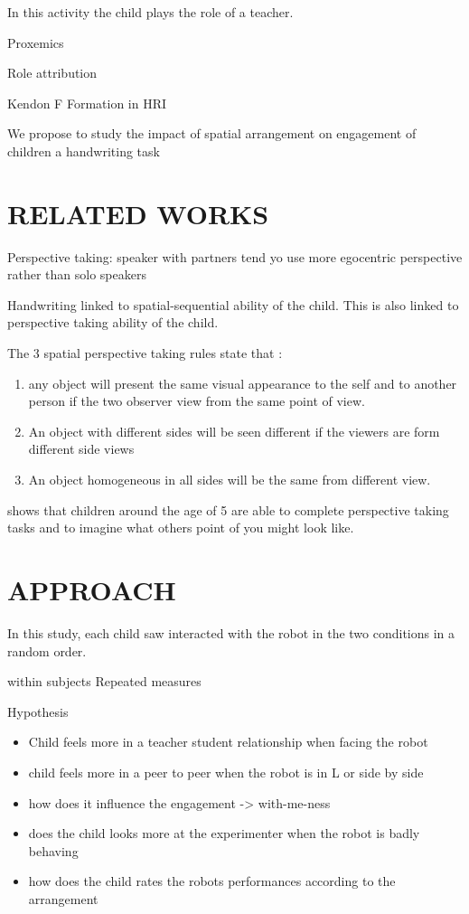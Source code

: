 \documentclass[letterpaper, 10 pt, conference]{ieeeconf}  %
\begin{document}
In this activity the child plays the role of a teacher. 

Proxemics

Role attribution

Kendon F Formation in HRI
\cite{huttenrauch2006investigating}

We propose to study the impact of spatial arrangement on engagement of children a handwriting task


\section{RELATED WORKS}


Perspective taking: speaker with partners tend yo use more egocentric perspective rather than solo speakers \cite{Schober} 

Handwriting linked to spatial-sequential ability of the child. 
This is also linked to perspective taking ability of the child. 

The 3 spatial perspective taking rules state that :
\begin{enumerate}
\item any object will present the same visual appearance to the self and to another person if the two observer view from the same point of view.
\item An object with different sides will be seen different if the viewers are form different side views
\item An object homogeneous in all sides will be the same from different view. 
\end{enumerate}




\cite{Newcombe1992} shows that children around the age of 5 are able to complete perspective taking tasks and to imagine what others point of you might look like.




\section{APPROACH}
In this study, each child saw interacted with the robot in the two conditions in a random order. 


within subjects Repeated measures 




Hypothesis
\begin{itemize}
\item Child feels more in a teacher student relationship when facing the robot
\item child feels more in a peer to peer when the robot is in L or side by side 
\item how does it influence the engagement -> with-me-ness
\item  does the child looks more at the experimenter when the robot is badly behaving
\item how does the child rates the robots performances according to  the arrangement
\end{itemize}
\end{document}
